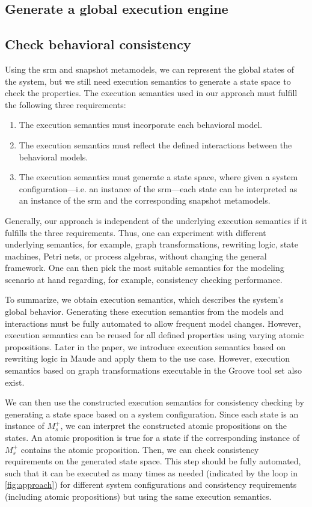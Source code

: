 \documentclass{jot}
\begin{document}
\subsection{Generate a global execution engine}

\subsection{Check behavioral consistency}

Using the \gls*{srm} and snapshot metamodels, we can represent the global states of the system, but we still need execution semantics to generate a state space to check the properties.
The execution semantics used in our approach must fulfill the following three requirements:
\begin{enumerate}
    \item The execution semantics must incorporate each behavioral model.
    \item The execution semantics must reflect the defined interactions between the behavioral models.
    \item The execution semantics must generate a state space, where given a system configuration---i.e. an instance of the \gls*{srm}---each state can be interpreted as an instance of the \gls*{srm} and the corresponding snapshot metamodels.
\end{enumerate}
Generally, our approach is independent of the underlying execution semantics if it fulfills the three requirements.
Thus, one can experiment with different underlying semantics, for example, graph transformations, rewriting logic, state machines, Petri nets, or process algebras, without changing the general framework.
One can then pick the most suitable semantics for the modeling scenario at hand regarding, for example, consistency checking performance.

To summarize, we obtain execution semantics, which describes the system's global behavior.
Generating these execution semantics from the models and interactions must be fully automated to allow frequent model changes.
However, execution semantics can be reused for all defined properties using varying atomic propositions. 
Later in the paper, we introduce execution semantics based on rewriting logic in Maude and apply them to the use case.
However, execution semantics based on graph transformations executable in the Groove tool set also exist. 

We can then use the constructed execution semantics for consistency checking by generating a state space based on a system configuration.
Since each state is an instance of $M_s^+$, we can interpret the constructed atomic propositions on the states.
An atomic proposition is true for a state if the corresponding instance of $M_s^+$ contains the atomic proposition.
Then, we can check consistency requirements on the generated state space.
This step should be fully automated, such that it can be executed as many times as needed (indicated by the loop in \cref{fig:approach}) for different system configurations and consistency requirements (including atomic propositions) but using the same execution semantics.
\end{document}
